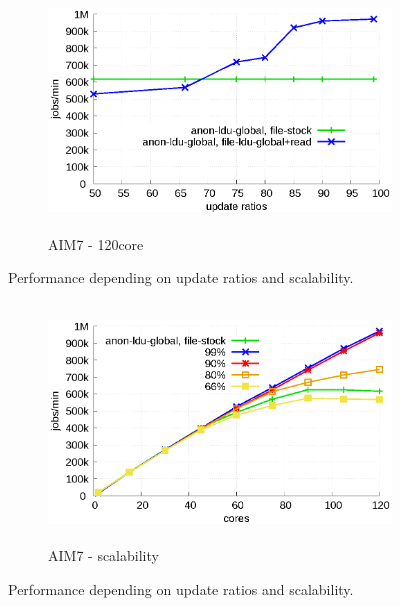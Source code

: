 \begin{figure}[t!]
    \centering
    \begin{subfigure}[b]{1\textwidth}
  \begin{center}
        \includegraphics[height=2.5in]{graph/ratio_aim7.eps}
        \caption{AIM7 - 120core}
  \end{center}
    \end{subfigure}%
    \caption{Performance depending on update ratios and scalability.}
    \label{fig:UpdateRate_aim7}
\end{figure}

\begin{figure}[t!]
    \centering
    \begin{subfigure}[b]{1\textwidth}
        \includegraphics[height=2.5in]{graph/ratio_aim7_core.eps}
        \caption{AIM7 - scalability}
    \end{subfigure}%
    \caption{Performance depending on update ratios and scalability.}
    \label{fig:UpdateRate_aim7_2}
\end{figure}

